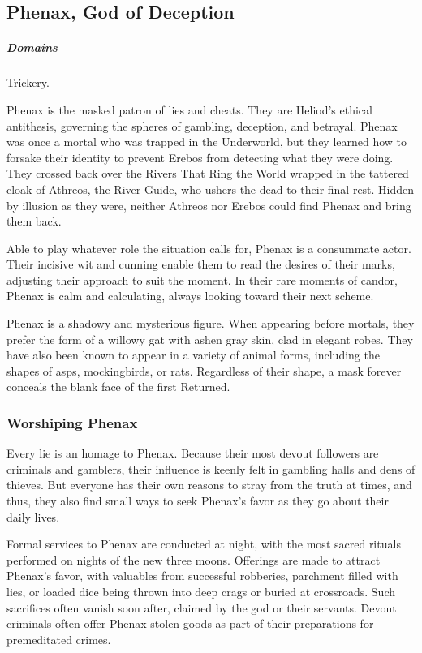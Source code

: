 \subsection*{Phenax, God of Deception} \label{ssec::phenax}
    \subparagraph{Domains} Trickery.

    Phenax is the masked patron of lies and cheats.
    They are Heliod's ethical antithesis, governing the spheres of gambling, deception, and betrayal.
    Phenax was once a mortal who was trapped in the Underworld, but they learned how to forsake their identity to prevent Erebos from detecting what they were doing.
    They crossed back over the Rivers That Ring the World wrapped in the tattered cloak of Athreos, the River Guide, who ushers the dead to their final rest.
    Hidden by illusion as they were, neither Athreos nor Erebos could find Phenax and bring them back.

    Able to play whatever role the situation calls for, Phenax is a consummate actor.
    Their incisive wit and cunning enable them to read the desires of their marks, adjusting their approach to suit the moment.
    In their rare moments of candor, Phenax is calm and calculating, always looking toward their next scheme.

    Phenax is a shadowy and mysterious figure.
    When appearing before mortals, they prefer the form of a willowy gat with ashen gray skin, clad in elegant robes.
    They have also been known to appear in a variety of animal forms, including the shapes of asps, mockingbirds, or rats.
    Regardless of their shape, a mask forever conceals the blank face of the first Returned.

    \subsubsection{Worshiping Phenax}
        Every lie is an homage to Phenax.
        Because their most devout followers are criminals and gamblers, their influence is keenly felt in gambling halls and dens of thieves.
        But everyone has their own reasons to stray from the truth at times, and thus, they also find small ways to seek Phenax's favor as they go about their daily lives.

        Formal services to Phenax are conducted at night, with the most sacred rituals performed on nights of the new three moons.
        Offerings are made to attract Phenax's favor, with valuables from successful robberies, parchment filled with lies, or loaded dice being thrown into deep crags or buried at crossroads.
        Such sacrifices often vanish soon after, claimed by the god or their servants.
        Devout criminals often offer Phenax stolen goods as part of their preparations for premeditated crimes.

